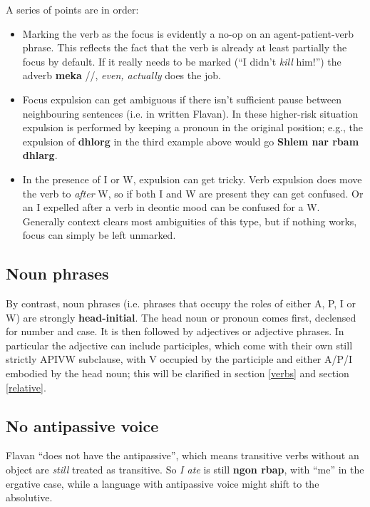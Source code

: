 \documentclass[10pt,oneside]{memoir}
\newcommand{\ipa}[1]{/\textipa{#1}/}
\begin{document}
\begin{multicols}{2}
A series of points are in order:

\begin{itemize}
    \item Marking the verb as the focus is evidently a no-op on an agent-patient-verb phrase. This reflects the fact that the verb is already at least partially the focus by default. If it really needs to be marked (``I didn't \emph{kill} him!'') the adverb \textbf{meka} \ipa{"mEka}, \emph{even, actually} does the job.
    \item Focus expulsion can get ambiguous if there isn't sufficient pause between neighbouring sentences (i.e. in written Flavan). In these higher-risk situation expulsion is performed by keeping a pronoun in the original position; e.g., the expulsion of \textbf{dhlorg} in the third example above would go \textbf{Shlem nar rbam dhlarg}.
    \item In the presence of I or W, expulsion can get tricky. Verb expulsion does move the verb to \emph{after} W, so if both I and W are present they can get confused. Or an I expelled after a verb in deontic mood can be confused for a W. Generally context clears most ambiguities of this type, but if nothing works, focus can simply be left unmarked.
\end{itemize}



\subsection{Noun phrases}

By contrast, noun phrases (i.e. phrases that occupy the roles of either A, P, I or W) are strongly \textbf{head-initial}. The head noun or pronoun comes first, declensed for number and case. It is then followed by adjectives or adjective phrases. In particular the adjective can include participles, which come with their own still strictly APIVW subclause, with V occupied by the participle and either A/P/I embodied by the head noun; this will be clarified in section \ref{verbs} and section \ref{relative}.

\subsection{No antipassive voice}

Flavan ``does not have the antipassive'', which means transitive verbs without an object are \emph{still} treated as transitive. So \emph{I ate} is still \textbf{ngon rbap}, with ``me'' in the ergative case, while a language with antipassive voice might shift to the absolutive.


\end{multicols}
\end{document}
